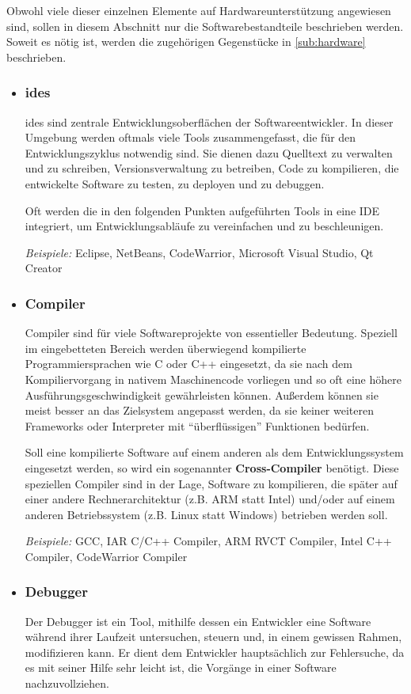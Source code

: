 Obwohl viele dieser einzelnen Elemente auf Hardwareunterstützung angewiesen
sind, sollen in diesem Abschnitt nur die Softwarebestandteile beschrieben
werden. Soweit es nötig ist, werden die zugehörigen Gegenstücke in
\autoref{sub:hardware} beschrieben.
\begin{itemize}
  \item \subsubsection*{\glspl{ide}} \glspl{ide} sind zentrale
  Entwicklungsoberflächen der Softwareentwickler. In dieser Umgebung werden
  oftmals viele Tools zusammengefasst, die für den Entwicklungszyklus notwendig
  sind. Sie dienen dazu Quelltext zu verwalten und zu schreiben,
  Versionsverwaltung zu betreiben, Code zu kompilieren, die entwickelte Software
  zu testen, zu deployen und zu debuggen.
  
  Oft werden die in den folgenden Punkten aufgeführten Tools in eine IDE
  integriert, um Entwicklungsabläufe zu vereinfachen und zu beschleunigen.
  
  \emph{Beispiele:} Eclipse, NetBeans, CodeWarrior, Microsoft Visual Studio, Qt
  Creator
  \item \subsubsection*{Compiler} Compiler sind für viele Softwareprojekte von
  essentieller Bedeutung. Speziell im eingebetteten Bereich werden überwiegend
  kompilierte Programmiersprachen wie C oder C++ eingesetzt, da sie nach dem
  Kompiliervorgang in nativem Maschinencode vorliegen und so oft eine höhere
  Ausführungsgeschwindigkeit gewährleisten können. Außerdem können sie meist
  besser an das Zielsystem angepasst werden, da sie keiner weiteren Frameworks
  oder Interpreter mit "`überflüssigen"' Funktionen bedürfen.
  
  Soll eine kompilierte Software auf einem anderen als dem Entwicklungssystem
  eingesetzt werden, so wird ein sogenannter \textbf{Cross-Compiler} benötigt.
  Diese speziellen Compiler sind in der Lage, Software zu kompilieren, die
  später auf einer andere Rechnerarchitektur (z.B. ARM statt Intel) und/oder auf
  einem anderen Betriebssystem (z.B. Linux statt Windows) betrieben werden soll.
  
  \emph{Beispiele:} GCC, IAR C/C++ Compiler, ARM RVCT Compiler, Intel C++
  Compiler, CodeWarrior Compiler
  \item \subsubsection*{Debugger}\label{subs:swdebugger} Der Debugger ist ein
  Tool, mithilfe dessen ein Entwickler eine Software während ihrer Laufzeit
  untersuchen, steuern und, in einem gewissen Rahmen, modifizieren kann. Er
  dient dem Entwickler hauptsächlich zur Fehlersuche, da es mit seiner Hilfe
  sehr leicht ist, die Vorgänge in einer Software nachzuvollziehen.
  

\end{itemize}
